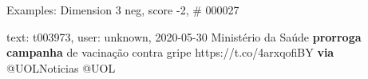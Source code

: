 \begin{frame}{Examples: Dimension 3 neg, score -2, \# 000027}
\footnotesize
\begin{alertblock}{text: t003973, user: unknown, 2020-05-30}
Ministério da Saúde \textbf{prorroga} \textbf{campanha} de vacinação contra 
gripe https://t.co/4arxqofiBY \textbf{via} @UOLNoticias @UOL 
\end{alertblock}
\end{frame}
